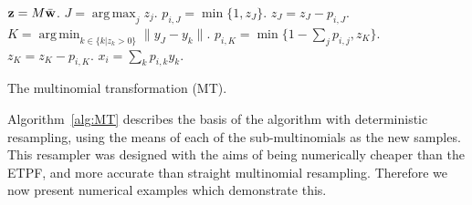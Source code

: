 \documentclass[final]{siamltex}
\renewcommand{\b}[1]{{\bf #1}}
\DeclareMathOperator*{\argmin}{arg\,min}
\DeclareMathOperator*{\argmax}{arg\,max}
\begin{document}
\begin{table}[!ht]
\centering
\begin{algorithm}[H]
\DontPrintSemicolon
\BlankLine
	$\b{z} = M\bar{\b{w}}$.\;
	{
		$J = \argmax_j z_j$.\;
		$p_{i,J} = \min\{1,z_J\}$.\;
		$z_J = z_J - p_{i,J}$.\;
		{
			$K = \argmin_{k \in \{k|z_k>0\}} \|y_J - y_k\|$.\;
			$p_{i,K} = \min\{1-\sum_j p_{i,j}, z_K\}$.\;
			$z_K = z_K - p_{i,K}$.\;
		}
		$x_i = \sum_k p_{i,k}y_k$.\;
	}
\caption{The  multinomial transformation (MT).\label{alg:MT}}
\end{algorithm}
\end{table}

Algorithm~\ref{alg:MT} describes the basis of the algorithm with
deterministic resampling, using the means of each of the
sub-multinomials as the new samples. This resampler was designed with the aims of being
numerically cheaper than the ETPF, and more accurate than straight multinomial
resampling. Therefore we now present numerical examples which
demonstrate this.
\end{document}
